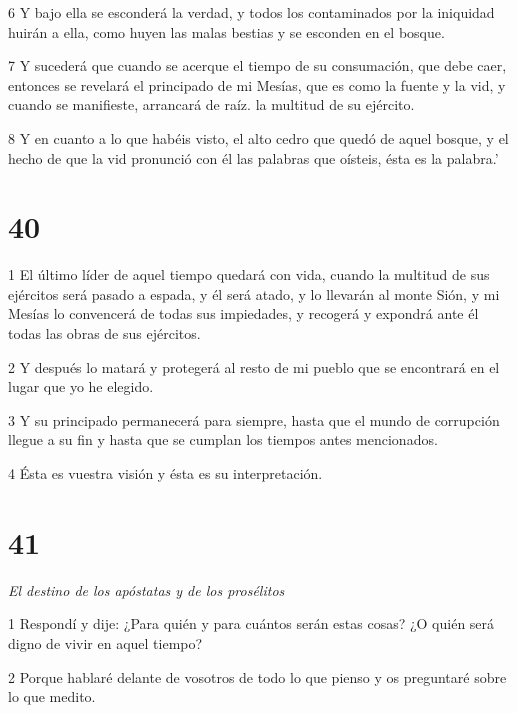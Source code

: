 \par 6 Y bajo ella se esconderá la verdad, y todos los contaminados por la iniquidad huirán a ella, como huyen las malas bestias y se esconden en el bosque.

\par 7 Y sucederá que cuando se acerque el tiempo de su consumación, que debe caer, entonces se revelará el principado de mi Mesías, que es como la fuente y la vid, y cuando se manifieste, arrancará de raíz. la multitud de su ejército.

\par 8 Y en cuanto a lo que habéis visto, el alto cedro que quedó de aquel bosque, y el hecho de que la vid pronunció con él las palabras que oísteis, ésta es la palabra.'

\chapter{40}

\par 1 El último líder de aquel tiempo quedará con vida, cuando la multitud de sus ejércitos será pasado a espada, y él será atado, y lo llevarán al monte Sión, y mi Mesías lo convencerá de todas sus impiedades, y recogerá y expondrá ante él todas las obras de sus ejércitos.

\par 2 Y después lo matará y protegerá al resto de mi pueblo que se encontrará en el lugar que yo he elegido.

\par 3 Y su principado permanecerá para siempre, hasta que el mundo de corrupción llegue a su fin y hasta que se cumplan los tiempos antes mencionados.

\par 4 Ésta es vuestra visión y ésta es su interpretación.


\chapter{41}

\par \textit{El destino de los apóstatas y de los prosélitos}

\par 1 Respondí y dije: ¿Para quién y para cuántos serán estas cosas? ¿O quién será digno de vivir en aquel tiempo?

\par 2 Porque hablaré delante de vosotros de todo lo que pienso y os preguntaré sobre lo que medito.

